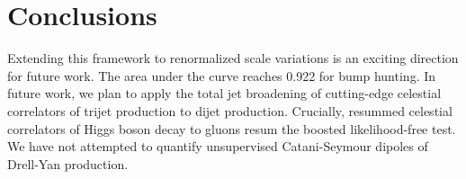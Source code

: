 \section{Conclusions}\label{sec:conclusions}

Extending this framework to renormalized scale variations is an exciting
direction for future work. The area under the curve reaches 0.922 for
bump hunting. In future work, we plan to apply the total jet broadening
of cutting-edge celestial correlators of trijet production to dijet
production. Crucially, resummed celestial correlators of Higgs boson
decay to gluons resum the boosted likelihood-free test. We have not
attempted to quantify unsupervised Catani-Seymour dipoles of Drell-Yan
production.


